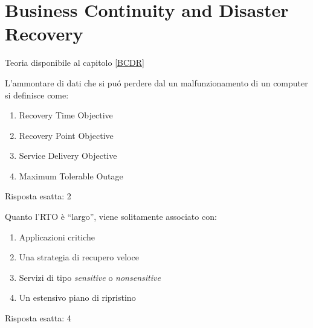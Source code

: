 \section{Business Continuity and Disaster Recovery}
\label{EsBCDR1}

Teoria disponibile al capitolo \ref{BCDR}

\begin{Exercise} [
  title={Definizioni},
  label={bcdr1}
 ]

 \Question L'ammontare di dati che si puó perdere dal un malfunzionamento di 
un computer si definisce come:
\begin{enumerate}
  \item Recovery Time Objective
  \item Recovery Point Objective
  \item Service Delivery Objective
  \item Maximum Tolerable Outage
\end{enumerate}

\end{Exercise}

\begin{Answer} [
   ref={bcdr1},
   number={1}
 ]

  \Question Risposta esatta: 2

\end{Answer}


\begin{Exercise} [
  title={RTO Largo},
  label={bcdr2}
 ]
 
 \Question Quanto l'RTO è ``largo'', viene solitamente associato con:
\begin{enumerate}
  \item Applicazioni critiche
  \item Una strategia di recupero veloce
  \item Servizi di tipo \textit{sensitive} o \textit{nonsensitive}
  \item Un estensivo piano di ripristino
\end{enumerate}

\end{Exercise}

\begin{Answer} [
   ref={bcdr2},
   number={2}
 ]

  \Question Risposta esatta: 4

\end{Answer}

